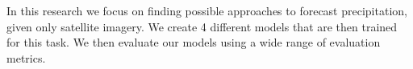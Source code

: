 In this research we focus on finding possible approaches
to forecast precipitation, given only satellite imagery.
We create 4 different models that are then trained for this task.
We then evaluate our models using a wide range of evaluation metrics.
